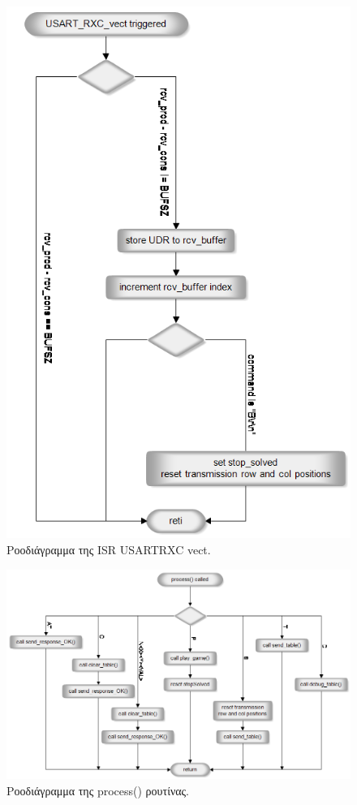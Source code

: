 \documentclass[a4paper,12pt]{article}
\begin{document}
\begin{figure}[h!]
\centering
\includegraphics[scale=0.75]{UART_RXC.png}
\caption{Ροοδιάγραμμα της ISR USART\textunderscore RXC \textunderscore vect.}
\label{fig:USART_RXC_vect_flo}
\end{figure}


\begin{figure}[h!]
\centering
\includegraphics[scale=0.65]{process.png}
\caption{Ροοδιάγραμμα της process() ρουτίνας.}
\label{fig:process_flo}
\end{figure}
\end{document}
